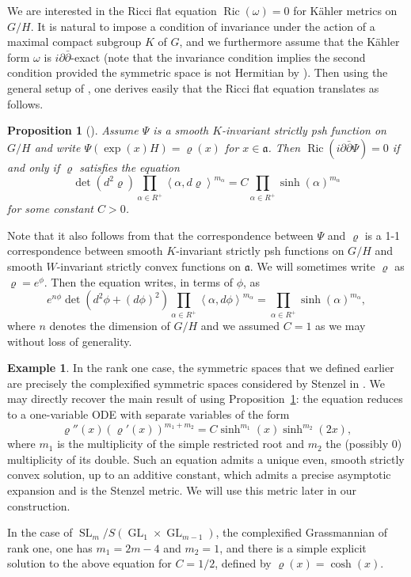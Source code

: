 \documentclass[10pt]{amsart}
\theoremstyle{plain}
\newtheorem{prop}[thm]{Proposition}
\theoremstyle{definition}
\newtheorem{exa}[thm]{Example}
\DeclareMathOperator{\Ric}{Ric}
\DeclareMathOperator{\SL}{SL}
\DeclareMathOperator{\GL}{GL}
\newcommand{\fa}{\mathfrak{a}}
\newcommand{\rRoots}{R}
\begin{document}
We are interested in the Ricci flat equation $\Ric(\omega)=0$ for Kähler metrics
on $G/H$. It is natural to impose a condition of invariance under the action of
a maximal compact subgroup $K$ of $G$, and we furthermore assume that the Kähler
form $\omega$ is $i\partial\bar{\partial}$-exact (note that the invariance
condition implies the second condition provided the symmetric space is not
Hermitian by \cite{AL92}). Then using the general setup of \cite{DelHoro},
one derives easily that the Ricci flat equation translates as follows.

\begin{prop}[\cite{DelHoro}]
\label{prop:Ric-eqn}
Assume $\Psi$ is a smooth $K$-invariant strictly psh function on $G/H$ and write
$\Psi(\exp(x)H)=\varrho(x)$ for $x\in \mathfrak{a}$. Then
$\Ric(i\partial \bar{\partial} \Psi)=0$ if and only if $\varrho$ satisfies
the equation
\begin{equation}\label{eq:12}
\det(d^2\varrho)\prod_{\alpha\in \rRoots^+} \left<\alpha,d\varrho\right>^{m_{\alpha}} =
C \prod_{\alpha\in \rRoots^+} \sinh(\alpha)^{m_{\alpha}}
\end{equation}
for some constant $C>0$.
\end{prop}

Note that it also follows from \cite{AL92} that the correspondence between $\Psi$
and $\varrho$ is a 1-1 correspondence between smooth $K$-invariant strictly psh
functions on $G/H$ and smooth $W$-invariant strictly convex functions on $\fa$.
We will sometimes write $\varrho$ as $\varrho=e^{\phi}$. Then the equation writes, in terms of
$\phi$, as
\begin{equation}
e^{n\phi}\det(d^2\phi+(d\phi)^2)\prod_{\alpha\in \rRoots^+} \left<\alpha,d\phi\right>^{m_{\alpha}} =
\prod_{\alpha\in \rRoots^+} \sinh(\alpha)^{m_{\alpha}},
\end{equation}
where $n$ denotes the dimension of $G/H$ and we assumed $C=1$ as we may without loss of generality.

\begin{exa}
\label{exa-Stenzel}
In the rank one case, the symmetric spaces that we defined earlier are precisely
the complexified symmetric spaces considered by Stenzel in \cite{Ste93}.
We may directly recover the main result of \cite{Ste93} using
Proposition~\ref{prop:Ric-eqn}: the equation reduces to
a one-variable ODE with separate variables of the form
\[ \varrho''(x) (\varrho'(x))^{m_1+m_2} = C\sinh^{m_1}(x)\sinh^{m_2}(2x), \]
where $m_1$ is the multiplicity of the simple restricted root and $m_2$ the
(possibly $0$) multiplicity of its double. Such an equation admits a unique
even, smooth strictly convex solution, up to an additive constant, which admits a precise
asymptotic expansion and is the Stenzel metric. We will use this metric later
in our construction.

In the case of $\SL_m/S(\GL_1\times \GL_{m-1})$, the complexified Grassmannian of rank one,
one has $m_1=2m-4$ and $m_2=1$,
and there is a simple explicit solution to the above equation
for $C=1/2$, defined by $\varrho(x)=\cosh(x)$.
\end{exa}
\end{document}
